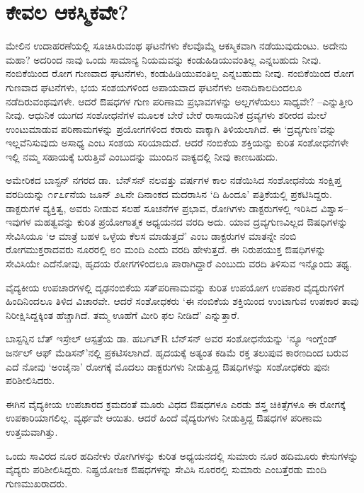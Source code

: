 \section*{ಕೇವಲ ಆಕಸ್ಮಿಕವೇ?}


ಮೇಲಿನ ಉದಾಹರಣೆಯಲ್ಲಿ ಸೂಚಿಸಿರುವಂಥ ಘಟನೆಗಳು ಕೆಲವೊಮ್ಮೆ ಆಕಸ್ಮಿಕವಾಗಿ ನಡೆಯುವುದುಂಟು. ಅದೇನು ಮಹಾ? ಅದರಿಂದ ನಾವು ಒಂದು ಸಾಮಾನ್ಯ ನಿಯಮವನ್ನು ಕಂಡು\-ಹಿಡಿಯು\-ವಂತಿಲ್ಲ ಎನ್ನಬಹುದು ನೀವು. ನಂಬಿಕೆಯಿಂದ ರೋಗ ಗುಣವಾದ ಘಟನೆಗಳು, ಕಂಡುಹಿಡಿಯುವಂತಿಲ್ಲ ಎನ್ನಬಹುದು ನೀವು. ನಂಬಿಕೆಯಿಂದ ರೋಗ ಗುಣವಾದ ಘಟನೆಗಳು, ಭಯ ಸಂಶಯಗಳಿಂದ ಅಪಾಯವಾದ ಘಟನೆಗಳು ಅನಾದಿಕಾಲದಿಂದಲೂ ನಡೆದಿರುವಂಥವುಗಳೇ. ಆದರೆ ಔಷಧಗಳ ಗುಣ ಪರಿಣಾಮ ಪ್ರಭಾವಗಳನ್ನು ಅಲ್ಲಗಳೆಯಲು ಸಾಧ್ಯವೇ? –ಎನ್ನುತ್ತೀರಿ ನೀವು. ಆಧುನಿಕ ಯುಗದ ಸಂಶೋಧನೆಗಳ ಮೂಲಕ ಬೇರೆ ಬೇರೆ ರಾಸಾಯನಿಕ ದ್ರವ್ಯಗಳು ಶರೀರದ ಮೇಲೆ ಉಂಟುಮಾಡುವ ಪರಿಣಾಮಗಳನ್ನು ಪ್ರಯೋಗಗಳಿಂದ ಕರಾರು ವಾಕ್ಕಾಗಿ ತಿಳಿಯಲಾಗಿದೆ. ಈ ‘ದ್ರವ್ಯಗುಣ’ವನ್ನು ಇಲ್ಲವೆನಿಸುವುದು ಅಸಾಧ್ಯ ಎಂಬ ಸಂಶಯ ಸರಿಯಾದುದೆ. ಆದರೆ ನಂಬಿಕೆಯ ಶಕ್ತಿಯನ್ನು ಕುರಿತ ಸಂಶೋಧನೆಗಳೇ ಇಲ್ಲಿ ನಮ್ಮ ಸಹಾಯಕ್ಕೆ ಬರುತ್ತಿವೆ ಎಂಬುದನ್ನು ಮುಂದಿನ ವಾಕ್ಯದಲ್ಲಿ ನೀವು ಕಾಣಬಹುದು.

ಅಮೇರಿಕದ ಬಾಸ್ಟನ್ ನಗರದ ಡಾ.\ ಬೆನ್​ಸನ್ ನಲವತ್ತು ವರ್ಷಗಳ ಕಾಲ ನಡೆಯಿಸಿದ ಸಂಶೋಧನೆಯ ಸಂಕ್ಷಿಪ್ತ ವರದಿಯನ್ನು ೧೯೭೯ನೆಯ ಜೂನ್ ೨೬ನೇ ದಿನಾಂಕದ ಮದರಾಸಿನ ‘ದಿ ಹಿಂದೂ’ ಪತ್ರಿಕೆಯಲ್ಲಿ ಪ್ರಕಟಿಸಿದ್ದರು. ಡಾಕ್ಟರುಗಳ ವ್ಯಕ್ತಿತ್ವ, ಅವರು ನೀಡುವ ಸಲಹೆ ಸೂಚನೆಗಳ ಪ್ರಭಾವ, ರೋಗಿಗಳು ಡಾಕ್ಟರುಗಳಲ್ಲಿ ಇರಿಸಿದ ವಿಶ್ವಾಸ–ಇವುಗಳ ಮಹತ್ವವನ್ನು ಕುರಿತ ಪ್ರಯೋಗಾತ್ಮಕ ಅಧ್ಯಯನದ ವರದಿ ಅದು. ಯಾವ ದ್ರವ್ಯಗುಣವಿಲ್ಲದ ಔಷಧಿಗಳನ್ನು ಸೇವಿಸಿಯೂ ‘ಆ ಮಾತ್ರೆ ಬಹಳ ಒಳ್ಳೆಯ ಕೆಲಸ ಮಾಡುತ್ತದೆ’ ಎಂಬ ಡಾಕ್ಟರುಗಳ ಮಾತನ್ನೇ ನಂಬಿ ರೋಗಮುಕ್ತರಾದವರು ನೂರರಲ್ಲಿ ೮೦ ಮಂದಿ ಎಂದು ವರದಿ ಹೇಳುತ್ತದೆ. ಈ ನಿರುಪಯುಕ್ತ ಔಷಧಿಗಳನ್ನು ಸೇವಿಸಿಯೇ ಎದೆನೋವು, ಹೃದಯ ರೋಗಗಳಿಂದಲೂ ಪಾರಾಗಿದ್ದಾರೆ ಎಂಬುದು ವರದಿ ತಿಳಿಸುವ ಇನ್ನೊಂದು ತಥ್ಯ.

ವೈದ್ಯಕೀಯ ಉಪಚಾರಗಳಲ್ಲಿ ದೃಢನಂಬಿಕೆಯ ಸತ್​ಪರಿಣಾಮವನ್ನು ಕುರಿತ ಉಪಯೋಗ ಉಪಕಾರ ವೈದ್ಯರುಗಳಿಗೆ ಹಿಂದಿನಿಂದಲೂ ತಿಳಿದ ವಿಚಾರವೇ. ಆದರೆ ಸಂಶೋಧಕರು ‘ಈ ನಂಬಿಕೆಯ ಶಕ್ತಿಯಿಂದ ಉಂಟಾಗುವ ಉಪಕಾರ ತಾವು ನಿರೀಕ್ಷಿಸಿದ್ದಕ್ಕಿಂತ ಹೆಚ್ಚಾಗಿದೆ. ತಮ್ಮ ಊಹೆಗೆ ಮೀರಿ ಫಲ ನೀಡಿದೆ’ ಎನ್ನುತ್ತಾರೆ.

ಬಾಸ್ಟನ್ನಿನ ಬೆತ್ ಇಸ್ರೇಲ್ ಆಸ್ಪತ್ರೆಯ ಡಾ. ಹರ್ಬಟ್R ಬೆನ್​ಸನ್ ಅವರ ಸಂಶೋಧನೆಯನ್ನು ‘ನ್ಯೂ ಇಂಗ್ಲೆಂಡ್ ಜರ್ನಲ್ ಆಫ್ ಮೆಡಿಸನ್​’ನಲ್ಲಿ ಪ್ರಕಟಿಸಲಾಗಿದೆ. ಹೃದಯಕ್ಕೆ ಅತ್ಯಂತ ಕಡಿಮೆ ರಕ್ತ ತಲುಪುವ ಕಾರಣದಿಂದ ಬರುವ ಎದೆ ನೋವು ‘ಅಂಜೈನಾ’ ರೋಗಕ್ಕೆ ಮೊದಲು ಡಾಕ್ಟರುಗಳು ನೀಡುತ್ತಿದ್ದ ಔಷಧಿಗಳನ್ನು ಸಂಶೋಧಕರು ಪುನಃ ಪರಿಶೀಲಿಸಿದರು.

ಈಗಿನ ವೈದ್ಯಕೀಯ ಉಪಚಾರದ ಕ್ರಮದಂತೆ ಮೂರು ವಿಧದ ಔಷಧಗಳೂ ಎರಡು ಶಸ್ತ್ರ ಚಿಕಿತ್ಸೆಗಳೂ ಈ ರೋಗಕ್ಕೆ ಉಪಕಾರಿಯಾಗಲಿಲ್ಲ. ವ್ಯರ್ಥವೇ ಆಯಿತು. ಆದರೆ ಹಿಂದೆ ವೈದ್ಯರುಗಳು ನೀಡುತ್ತಿದ್ದ ಔಷಧಗಳ ಪರಿಣಾಮ ಉತ್ತಮವಾಗಿತ್ತು.

ಒಂದು ಸಾವಿರದ ನೂರ ಹದಿನೇಳು ರೋಗಿಗಳನ್ನು ಕುರಿತ ಅಧ್ಯಯನದಲ್ಲಿ ಸುಮಾರು ನೂರ ಹದಿಮೂರು ಕೇಸುಗಳನ್ನು ವೈದ್ಯರು ಪರಿಶೀಲಿಸಿದ್ದರು. ನಿಷ್ಪ್ರಯೋಜಕ ಔಷಧಗಳನ್ನು ಸೇವಿಸಿ ನೂರರಲ್ಲಿ ಸುಮಾರು ಎಂಬತ್ತೆರಡು ಮಂದಿ ಗುಣಮುಖರಾದರು.

